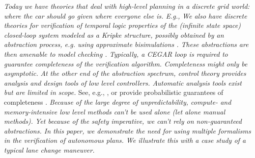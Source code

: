 {\it Today we have theories that deal with high-level planning in a discrete grid world: where the car should go given where everyone else is. E.g., }
{\it We also have discrete theories for verification of temporal logic properties of the (infinite state space) closed-loop system modeled as a Kripke structure, possibly obtained by an abstraction process, e.g. using approximate bisimulations . 
	These abstractions are then amenable to model checking .
	Typically, a CEGAR loop is required to guarantee completeness of the verification algorithm. Completeness might only be asymptotic.}
{\it At the other end of the abstraction spectrum, control theory provides analysis and design tools of low level controllers. Automatic analysis tools exist but are limited in scope.}
See, e.g., , or provide probabilistic guarantees of completeness .
{\it Because of the large degree of unpredictability, compute- and memory-intensive low level methods can't be used alone (let alone manual methods). 
	Yet because of the safety imperative, we can't rely on non-guaranteed abstractions.  
	In this paper, we demonstrate the need for using multiple formalisms in the verification of autonomous plans. 
	We illustrate this with a case study of a typical lane change maneuver.}

